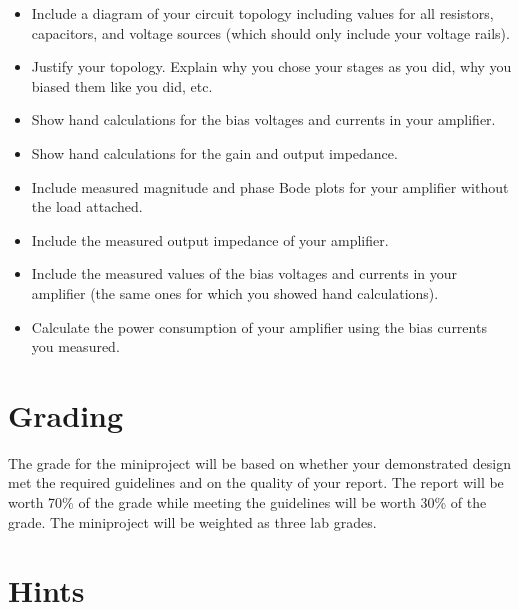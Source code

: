 \documentclass{article}
\begin{document}
\begin{itemize}
  \item Include a diagram of your circuit topology including values for all resistors, capacitors, and voltage sources (which should only include your voltage rails).
  \item Justify your topology. Explain why you chose your stages as you did, why you biased them like you did, etc.
  \item Show hand calculations for the bias voltages and currents in your amplifier.
  \item Show hand calculations for the gain and output impedance.
  \item Include measured magnitude and phase Bode plots for your amplifier without the load attached.
  \item Include the measured output impedance of your amplifier.
  \item Include the measured values of the bias voltages and currents in your amplifier (the same ones for which you showed hand calculations).
  \item Calculate the power consumption of your amplifier using the bias currents you measured.
\end{itemize}

\section{Grading}

The grade for the miniproject will be based on whether your demonstrated design met the required guidelines and on the quality of your report. The report will be worth \unit{70}{\%} of the grade while meeting the guidelines will be worth \unit{30}{\%} of the grade. The miniproject will be weighted as three lab grades.

\section{Hints}
\end{document}
